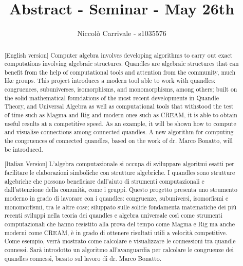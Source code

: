 \documentclass{Thesis/mcom-l}
\begin{document}
\title{Abstract - Seminar - May 26th}
\author{Niccolò Carrivale - s1035576}

\maketitle

\begin{abstract}[\textsf{English version}]
    Computer algebra involves developing algorithms to carry out exact computations involving algebraic structures. Quandles are algebraic structures that can benefit from the help of computational tools and attention from the community, much like groups. This project introduces a modern tool able to work with quandles: congruences, subuniverses, isomorphisms, and monomorphisms, among others; built on the solid mathematical foundations of the most recent developments in Quandle Theory, and Universal Algebra as well as computational tools that withstood the test of time such as Magma and Rig and modern ones such as CREAM, it is able to obtain useful results at a competitive speed. As an example, it will be shown how to compute and visualise connections among connected quandles.
    A new algorithm for computing the congruences of connected quandles, based on the work of dr. Marco Bonatto, will be introduced.
\end{abstract}
\begin{abstract}[\textsf{Italian Version}]
    L'algebra computazionale si occupa di sviluppare algoritmi esatti per facilitare le elaborazioni simboliche con strutture algebriche. I quandles sono strutture algebriche che possono beneficiare dall'aiuto di strumenti computazionali e dall'attenzione della comunità, come i gruppi. Questo progetto presenta uno strumento moderno in grado di lavorare con i quandles: congruenze, subuniversi, isomorfismi e monomorfismi, tra le altre cose; siluppato sulle solide fondamenta matematiche dei più recenti sviluppi nella teoria dei quandles e algebra universale così come strumenti computazionali che hanno resistito alla prova del tempo come Magma e Rig ma anche moderni come CREAM, è in grado di ottenere risultati utili a velocità competitive. Come esempio, verrà mostrato come calcolare e visualizzare le connessioni tra quandle connessi. Sarà introdotto un algoritmo all'avanguardia per calcolare le congruenze dei quandles connessi, basato sul lavoro di dr. Marco Bonatto.
\end{abstract}
\end{document}
